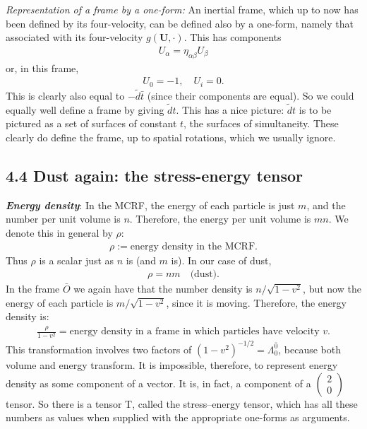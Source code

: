 \documentclass[12pt]{book}
\begin{document}
    \textit{Representation of a frame by a one-form:} 
    An inertial frame, which up to now has been defined by its four-velocity, can be defined also by a one-form, namely that associated with its four-velocity \(g(\mathbf{U}, \cdot)\). This has components
    \begin{align}
    U_\alpha = \eta_{\alpha\beta} U_\beta
    \end{align}
    or, in this frame,
    \begin{align}
    U_0 = -1, \quad U_i = 0.
    \end{align}
    This is clearly also equal to \(-\tilde{d}\bar{t}\) (since their components are equal). So we could equally well define a frame by giving \(\tilde{d} t\). This has a nice picture: \(\tilde{d} t\) is to be pictured as a set of surfaces of constant \(t\), the surfaces of simultaneity. These clearly do define the frame, up to spatial rotations, which we usually ignore.

    \subsection{4.4 Dust again: the stress-energy tensor}

    \textit{\textbf{Energy density}}:
    In the MCRF, the energy of each particle is just \(m\), and the number per unit volume is \(n\). Therefore, the energy per unit volume is \(mn\). We denote this in general by \(\rho\):
    \begin{align}
    \rho := \text{energy density in the MCRF}. \tag{4.11}
    \end{align}
    Thus \(\rho\) is a scalar just as \(n\) is (and \(m\) is). In our case of dust,
    \begin{align}
    \rho = nm \quad \text{(dust)}. \tag{4.12}
    \end{align}
    In the frame \(\bar{O}\) we again have that the number density is \(n / \sqrt{1 - v^2}\), but now the energy of each particle is \(m / \sqrt{1 - v^2}\), since it is moving. Therefore, the energy density is:
    \begin{align}
    \frac{\rho}{1 - v^2} = \text{energy density in a frame in which particles have velocity } v. \tag{4.13}
    \end{align}
    This transformation involves two factors of \((1 - v^2)^{-1/2} = \Lambda^{\bar 0} _0\), because both volume and energy transform. It is impossible, therefore, to represent energy density as some component of a vector. It is, in fact, a component of a \( \begin{pmatrix} 2 \\ 0 \end{pmatrix} \) tensor. So there is a tensor T, called the stress–energy tensor, which has all these numbers as values when supplied with the appropriate one-forms as arguments.
    
\end{document}
